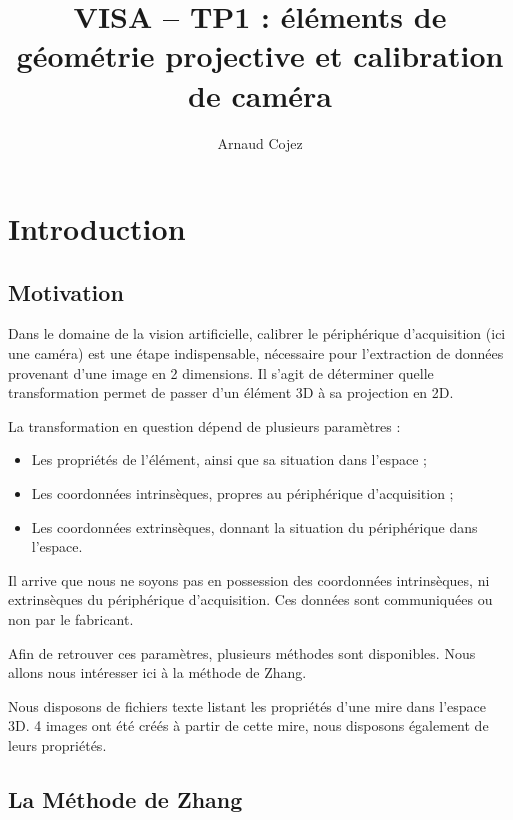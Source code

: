 \documentclass[a4paper]{article}
\begin{document}
\title{VISA -- TP1 : éléments de géométrie projective et calibration de caméra}
\author{Arnaud Cojez}
\date{}

\maketitle

\newpage
\tableofcontents
\newpage

\section{Introduction}

\subsection{Motivation}
Dans le domaine de la vision artificielle, calibrer le périphérique d'acquisition (ici une caméra) est une étape indispensable, nécessaire pour l'extraction de données provenant d'une image en 2 dimensions.
Il s'agit de déterminer quelle transformation permet de passer d'un élément 3D à sa projection en 2D.

La transformation en question dépend de plusieurs paramètres :
\begin{itemize}
  \item Les propriétés de l'élément, ainsi que sa situation dans l'espace ;
  \item Les coordonnées intrinsèques, propres au périphérique d'acquisition ;
  \item Les coordonnées extrinsèques, donnant la situation du périphérique dans l'espace.
\end{itemize}

Il arrive que nous ne soyons pas en possession des coordonnées intrinsèques, ni extrinsèques du périphérique d'acquisition. Ces données sont communiquées ou non par le fabricant.

Afin de retrouver ces paramètres, plusieurs méthodes sont disponibles. Nous allons nous intéresser ici à la méthode de Zhang.

Nous disposons de fichiers texte listant les propriétés d'une mire dans l'espace 3D. 4 images ont été créés à partir de cette mire, nous disposons également de leurs propriétés.

\subsection{La Méthode de Zhang}
\end{document}
